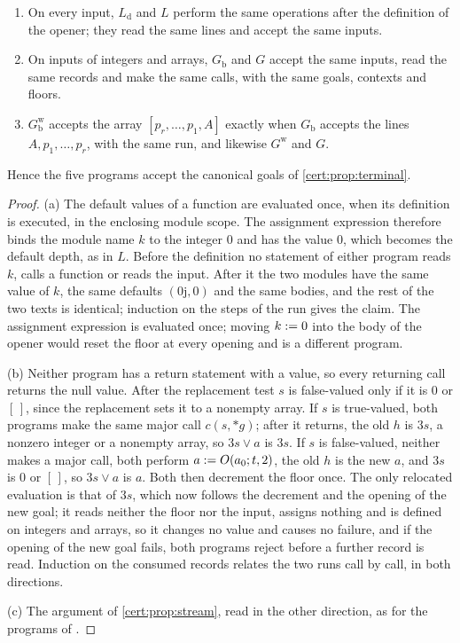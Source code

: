 \begin{proposition}\label{cert:prop:terminal-rewrites}
\begin{enumerate}[label=(\alph*)]
\item On every input, $L_{\mathrm d}$ and $L$ perform the same operations after
the definition of the opener; they read the same lines and accept the same
inputs.
\item On inputs of integers and arrays, $G_{\mathrm b}$ and $G$ accept the same
inputs, read the same records and make the same calls, with the same goals,
contexts and floors.
\item $G^{\mathrm w}_{\mathrm b}$ accepts the array $[p_r,\dots,p_1,A]$ exactly
when $G_{\mathrm b}$ accepts the lines $A,p_1,\dots,p_r$, with the same run, and
likewise $G^{\mathrm w}$ and $G$.
\end{enumerate}
Hence the five programs accept the canonical goals of \cref{cert:prop:terminal}.
\end{proposition}
\begin{proof}
(a) The default values of a function are evaluated once, when its definition
is executed, in the enclosing module scope. The assignment expression therefore
binds the module name $k$ to the integer $0$ and has the value $0$, which
becomes the default depth, as in $L$. Before the definition no statement of
either program reads $k$, calls a function or reads the input. After it the
two modules have the same value of $k$, the same defaults $(0\mathrm{j},0)$ and
the same bodies, and the rest of the two texts is identical; induction on the
steps of the run gives the claim. The assignment expression is evaluated once;
moving $k\mathrel{:=} 0$ into the body of the opener would reset the floor at every
opening and is a different program.

(b) Neither program has a return statement with a value, so every returning
call returns the null value. After the replacement test $s$ is false-valued
only if it is $0$ or $[\,]$, since the replacement sets it to a nonempty array.
If $s$ is true-valued, both programs make the same major call $c(s,{*}g)$; after
it returns, the old $h$ is $3s$, a nonzero integer or a nonempty array, so $3s\lor
a$ is $3s$. If $s$ is false-valued, neither makes a major call, both perform
$a\mathrel{:=} O(a_0;t,2)$, the old $h$ is the new $a$, and $3s$ is $0$ or $[\,]$, so
$3s\lor a$ is $a$. Both then decrement the floor once. The only relocated
evaluation is that of $3s$, which now follows the decrement and the opening of
the new goal; it reads neither the floor nor the input, assigns nothing and is
defined on integers and arrays, so it changes no value and causes no failure,
and if the opening of the new goal fails, both programs reject before a further
record is read. Induction on the consumed records relates the two runs call by
call, in both directions.

(c) The argument of \cref{cert:prop:stream}, read in the other direction, as for
the programs of .
\end{proof}

